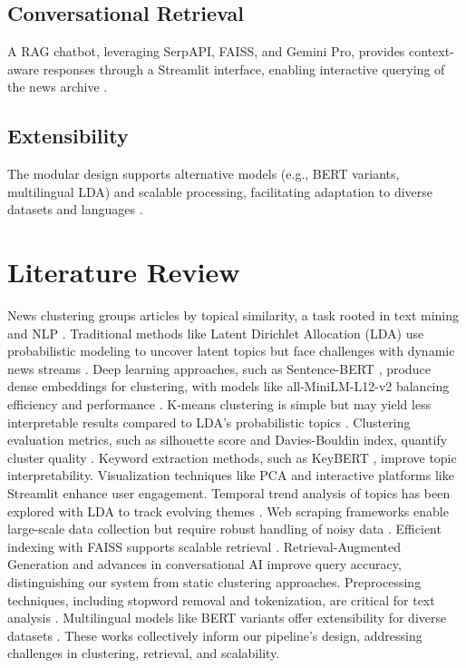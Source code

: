 \documentclass[conference]{IEEEtran}
\begin{document}
\subsection{Conversational Retrieval}
A RAG chatbot, leveraging SerpAPI, FAISS, and Gemini Pro, provides context-aware responses through a Streamlit interface, enabling interactive querying of the news archive \cite{lewis2020retrieval,radford2019language}.

\subsection{Extensibility}
The modular design supports alternative models (e.g., BERT variants, multilingual LDA) and scalable processing, facilitating adaptation to diverse datasets and languages \cite{devlin2019bert}.

\section{Literature Review}
News clustering groups articles by topical similarity, a task rooted in text mining and NLP \cite{hotho2005brief}. Traditional methods like Latent Dirichlet Allocation (LDA) \cite{blei2003latent} use probabilistic modeling to uncover latent topics but face challenges with dynamic news streams \cite{hoffman2010online}. Deep learning approaches, such as Sentence-BERT \cite{reimers2019sentencebert}, produce dense embeddings for clustering, with models like all-MiniLM-L12-v2 balancing efficiency and performance \cite{wang2020minilm}. K-means clustering is simple but may yield less interpretable results compared to LDA’s probabilistic topics \cite{blei2003latent,hartigan1979algorithm}. Clustering evaluation metrics, such as silhouette score and Davies-Bouldin index, quantify cluster quality \cite{rousseeuw1987silhouettes,davies1979cluster}. Keyword extraction methods, such as KeyBERT \cite{grootendorst2020keybert}, improve topic interpretability. Visualization techniques like PCA \cite{van2008visualizing} and interactive platforms like Streamlit \cite{streamlit2020} enhance user engagement. Temporal trend analysis of topics has been explored with LDA to track evolving themes \cite{wei2010lda}. Web scraping frameworks enable large-scale data collection but require robust handling of noisy data \cite{mitchell2018web}. Efficient indexing with FAISS supports scalable retrieval \cite{johnson2019billion}. Retrieval-Augmented Generation \cite{lewis2020retrieval} and advances in conversational AI \cite{radford2019language} improve query accuracy, distinguishing our system from static clustering approaches. Preprocessing techniques, including stopword removal and tokenization, are critical for text analysis \cite{jurafsky2009speech}. Multilingual models like BERT variants offer extensibility for diverse datasets \cite{devlin2019bert}. These works collectively inform our pipeline’s design, addressing challenges in clustering, retrieval, and scalability.
\end{document}
